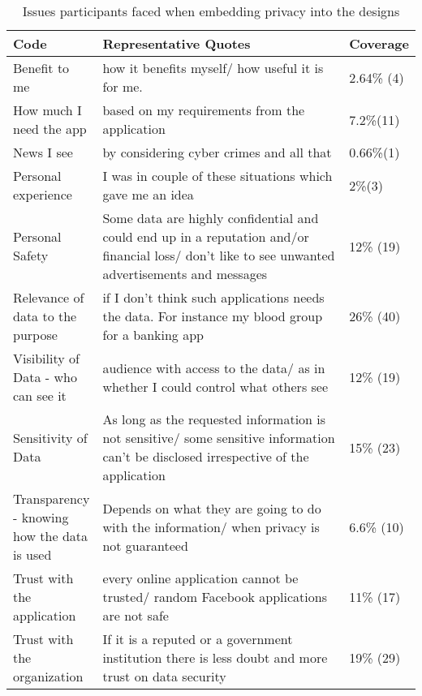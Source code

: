 \documentclass[10pt]{article}
\begin{document}
\begin{center}
\begin{table*}[htbp]
\caption{Issues participants faced when embedding privacy into the designs}
\begin{center}
\begin{adjustbox}{width=1\textwidth}
\begin{tabular}{|p{0.20\linewidth}|p{0.7\linewidth}|p{0.1\linewidth}|}
\hline
Code &  Representative Quotes & Coverage\\
\hline
Benefit to me &how it benefits myself/ how useful it is for me. & 2.64\% (4)\\
\hline
How much I need the app &  based on my requirements from the application & 7.2\%(11)\\
\hline
News I see  & by considering cyber crimes and all that & 0.66\%(1) \\
\hline
Personal experience &  I was in couple of these situations which gave me an idea & 2\%(3) \\
\hline
Personal Safety & Some data are highly confidential and could end up in a reputation and/or financial loss/  don't like to see unwanted advertisements and messages & 12\% (19)\\ 
\hline
Relevance of data to the purpose &if I don't think such applications needs the data. For instance my blood group for a banking app
 & 26\% (40)\\ 
\hline
Visibility of Data - who can see it & audience with access to the data/ as in whether I could control what others see & 12\% (19)\\ 
\hline
Sensitivity of Data & As long as the requested information is not sensitive/  some sensitive information can't be disclosed irrespective of the application
 & 15\% (23)\\ 
\hline
Transparency - knowing how the data is used & Depends on what they are going to do with the information/ when privacy is not guaranteed & 6.6\% (10)\\ 
\hline
Trust with the application & every online application cannot be trusted/ random Facebook applications are not safe & 11\% (17)\\ 
\hline
Trust with the organization & If it is a reputed or a government institution there is less doubt and more trust on data security
 & 19\% (29)\\ 
\hline
\end{tabular}
\end{adjustbox}
\end{center}
\end{table*}
\end{center}
\end{document}
